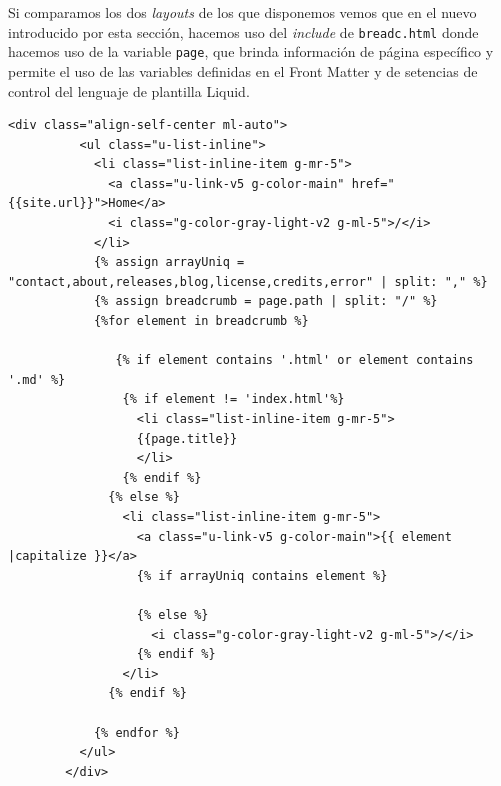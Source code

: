 Si comparamos los dos \textit{layouts} de los que disponemos vemos que en el nuevo introducido por esta sección, hacemos uso del \textit{include} de \texttt{breadc.html} donde hacemos uso de la variable \texttt{page}, que brinda información de página específico y permite el uso de las variables definidas en el Front Matter y de setencias de control del lenguaje de plantilla Liquid.   

\begin{lstlisting}[style=htmlcssjs,caption=Breadcrumber,label={code:breadcrum}]
  <div class="align-self-center ml-auto">
          <ul class="u-list-inline">
            <li class="list-inline-item g-mr-5">
              <a class="u-link-v5 g-color-main" href="{{site.url}}">Home</a>
              <i class="g-color-gray-light-v2 g-ml-5">/</i>
            </li>
            {% assign arrayUniq = "contact,about,releases,blog,license,credits,error" | split: "," %}
            {% assign breadcrumb = page.path | split: "/" %}
            {%for element in breadcrumb %}

               {% if element contains '.html' or element contains '.md' %}
                {% if element != 'index.html'%}
                  <li class="list-inline-item g-mr-5">
                  {{page.title}}
                  </li>
                {% endif %}
              {% else %}
                <li class="list-inline-item g-mr-5">
                  <a class="u-link-v5 g-color-main">{{ element |capitalize }}</a>
                  {% if arrayUniq contains element %}

                  {% else %}
                    <i class="g-color-gray-light-v2 g-ml-5">/</i>
                  {% endif %}
                </li>
              {% endif %}

            {% endfor %}
          </ul>
        </div>
\end{lstlisting}

